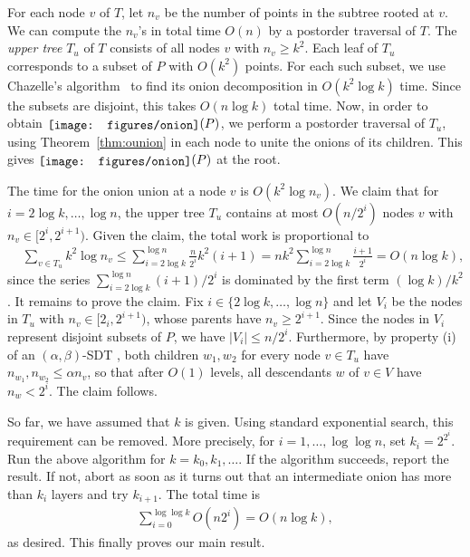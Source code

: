 \documentclass{paper}
\newcommand {\onion} {\raisebox{-0.25ex}{\texttt{[image: figures/onion]}}}
\begin{document}
For each node $v$ of $T$, let $n_v$ be the number of points in the subtree
rooted at $v$. We can compute the $n_v$'s in total time $O(n)$ by a postorder
traversal of $T$.
The \emph{upper tree} $T_u$ of $T$ consists of all nodes $v$ with
$n_v \geq k^2$.
Each leaf of $T_u$ corresponds to a subset of $P$ with
$O(k^2)$ points. For each such subset, we use Chazelle's 
algorithm~\cite{c-clps-85}
to find its onion decomposition in $O(k^2 \log k)$ time. 
Since the subsets are disjoint, this takes $O(n \log k)$ total time.
Now, in order to obtain $\onion(P)$, we perform a postorder traversal of 
$T_u$, using Theorem~\ref{thm:ounion} in each node to unite the onions of 
its children. This gives $\onion(P)$ at the root.

The time for the onion union at a node $v$ is
$O(k^2 \log n_v)$. 
We claim that for $i = 2\log k, \dots, \log n$, the upper tree
$T_u$ contains at most $O(n/2^i)$ nodes $v$ with $n_v \in [2^i, 2^{i+1})$.
Given the claim,  the 
total work is proportional to
\begin{align*}
 & \sum_{v \in T_u} k^2 \log n_v 
 \leq \sum_{i = 2\log k}^{\log n} \frac{n}{2^i} k^2 (i+1) 
 =  nk^2 \sum_{i = 2\log k}^{\log n } \frac{i+1}{2^i}  
  = O(n \log k),
\end{align*}
since the series $\sum_{i=2\log k}^{\log n} (i+1)/2^i$ is dominated by the
first term $(\log k)/k^2$. It remains to prove the claim. Fix 
$i \in \{2\log k, \dots, \log n\}$ and let $V_i$ be the nodes
in $T_u$ with $n_v \in [2_i, 2^{i+1})$, whose parents have
$n_v \geq 2^{i+1}$. Since the nodes in $V_i$ represent disjoint subsets
of $P$, we have $|V_i| \leq n/2^i$. 
Furthermore, by property (i) of an $(\alpha, \beta)$-SDT ,
both children $w_1, w_2$ for every node $v \in T_u$ 
have $n_{w_1}, n_{w_2} \leq \alpha n_v$, so that after $O(1)$ levels,
all descendants $w$ of $v \in V$ have $n_w < 2^i$. The claim follows.

So far, we have assumed that $k$ is given. Using standard exponential
search, this requirement can be removed. More precisely, 
for $i = 1, \dots, \log\log n$, set $k_i = 2^{2^i}$. Run the above algorithm 
for $k = k_0, k_1, \dots$. If the algorithm
succeeds, report the result. If not, abort as soon as it turns
out that an intermediate onion has more than $k_i$ layers and try
$k_{i+1}$. The total time is 
\begin{align*}
  \sum_{i=0}^{\log\log k} O(n 2^i) = O(n \log k), 
\end{align*}
as desired. This finally proves our main result.
\end{document}
